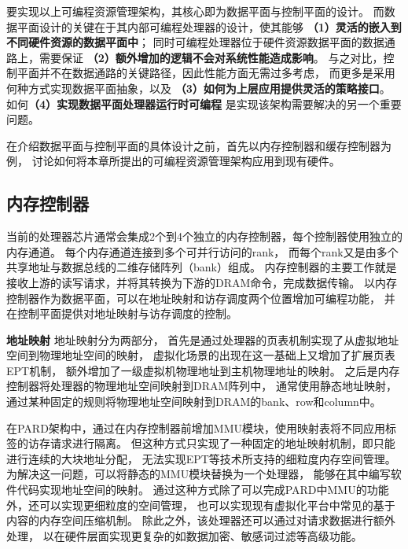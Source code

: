 要实现以上可编程资源管理架构，其核心即为数据平面与控制平面的设计。
而数据平面设计的关键在于其内部可编程处理器的设计，使其能够
\textbf{（1）灵活的嵌入到不同硬件资源的数据平面中}；
同时可编程处理器位于硬件资源数据平面的数据通路上，需要保证
\textbf{（2）额外增加的逻辑不会对系统性能造成影响}。
与之对比，控制平面并不在数据通路的关键路径，因此性能方面无需过多考虑，
而更多是采用何种方式实现数据平面抽象，以及
\textbf{（3）如何为上层应用提供灵活的策略接口}。
如何\textbf{（4）实现数据平面处理器运行时可编程}
是实现该架构需要解决的另一个重要问题。

在介绍数据平面与控制平面的具体设计之前，首先以内存控制器和缓存控制器为例，
讨论如何将本章所提出的可编程资源管理架构应用到现有硬件。


\subsection{内存控制器}
当前的处理器芯片通常会集成2个到4个独立的内存控制器，每个控制器使用独立的内存通道。
每个内存通道连接到多个可并行访问的rank，
而每个rank又是由多个共享地址与数据总线的二维存储阵列（bank）组成。
内存控制器的主要工作就是接收上游的读写请求，并将其转换为下游的DRAM命令，完成数据传输。
以内存控制器作为数据平面，可以在地址映射和访存调度两个位置增加可编程功能，
并在控制平面提供对地址映射与访存调度的控制。

\textbf{地址映射}\quad
地址映射分为两部分，
首先是通过处理器的页表机制实现了从虚拟地址空间到物理地址空间的映射，
虚拟化场景的出现在这一基础上又增加了扩展页表EPT机制，
额外增加了一级虚拟机物理地址到主机物理地址的映射。
之后是内存控制器将处理器的物理地址空间映射到DRAM阵列中，
通常使用静态地址映射，通过某种固定的规则将物理地址空间映射到DRAM的bank、row和column中。

在PARD架构中，通过在内存控制器前增加MMU模块，使用映射表将不同应用标签的访存请求进行隔离。
但这种方式只实现了一种固定的地址映射机制，即只能进行连续的大块地址分配，
无法实现EPT等技术所支持的细粒度内存空间管理。
为解决这一问题，可以将静态的MMU模块替换为一个处理器，
能够在其中编写软件代码实现地址空间的映射。
通过这种方式除了可以完成PARD中MMU的功能外，还可以实现更细粒度的空间管理，
也可以实现现有虚拟化平台中常见的基于内容的内存空间压缩机制。
除此之外，该处理器还可以通过对请求数据进行额外处理，
以在硬件层面实现更复杂的如数据加密、敏感词过滤等高级功能。

